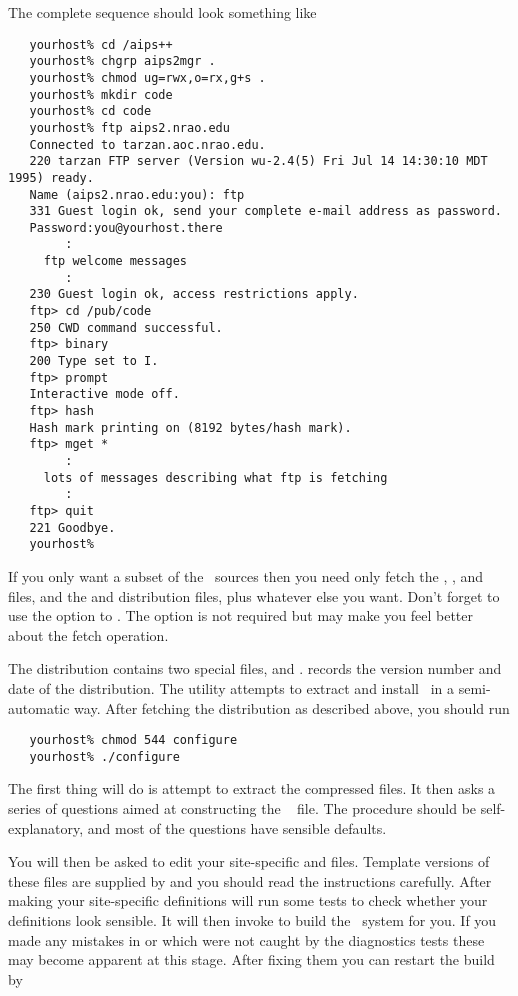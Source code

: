 The complete  sequence should look something like

\begin{verbatim}
   yourhost% cd /aips++
   yourhost% chgrp aips2mgr .
   yourhost% chmod ug=rwx,o=rx,g+s .
   yourhost% mkdir code
   yourhost% cd code
   yourhost% ftp aips2.nrao.edu
   Connected to tarzan.aoc.nrao.edu.
   220 tarzan FTP server (Version wu-2.4(5) Fri Jul 14 14:30:10 MDT 1995) ready.
   Name (aips2.nrao.edu:you): ftp
   331 Guest login ok, send your complete e-mail address as password.
   Password:you@yourhost.there
        :
     ftp welcome messages
        :
   230 Guest login ok, access restrictions apply.
   ftp> cd /pub/code
   250 CWD command successful.
   ftp> binary
   200 Type set to I.
   ftp> prompt
   Interactive mode off.
   ftp> hash
   Hash mark printing on (8192 bytes/hash mark).
   ftp> mget *
        :
     lots of messages describing what ftp is fetching
        :
   ftp> quit
   221 Goodbye.
   yourhost%
\end{verbatim}

\noindent
If you only want a subset of the \aipspp\ sources then you need only fetch the
, , and  files, and the
 and  distribution  files, plus whatever
else you want.  Don't forget to use the  option to .
The  option is not required but may make you feel better about the
fetch operation.

The distribution contains two special files,  and
.   records the version number and date of the
distribution.  The  utility attempts to extract and install
\aipspp\ in a semi-automatic way.  After fetching the distribution as
described above, you should run 

\begin{verbatim}
   yourhost% chmod 544 configure
   yourhost% ./configure
\end{verbatim}

\noindent
The first thing  will do is attempt to extract the
compressed  files.  It then asks a series of questions aimed at
constructing the \aipspp\  file.  The procedure should be
self-explanatory, and most of the questions have sensible defaults.

You will then be asked to edit your site-specific  and
 files.  Template versions of these files are supplied by
 and you should read the instructions carefully.  After
making your site-specific definitions  will run some tests
to check whether your  definitions look sensible.  It will then
invoke  to build the \aipspp\ system for you.  If you made any
mistakes in  or  which were not caught by the
diagnostics tests these may become apparent at this stage.  After fixing them
you can restart the build by

